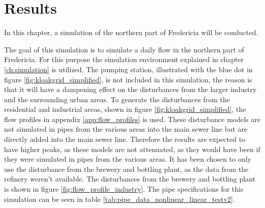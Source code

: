 \chapter{Results}\label{ch:results}
In this chapter, a simulation of the northern part of Fredericia will be conducted.

The goal of this simulation is to simulate a daily flow in the northern part of Fredericia.%
For this purpose the simulation environment explained in chapter \ref{ch:simulation} is utilized. The pumping station, illustrated with the blue dot in figure \ref{fig:kloakgrid_simplified}, is not included in this simulation, the reason is that it will have a dampening effect on the disturbances from the larger industry and the surrounding urban areas. 
To generate the disturbances from the residential and industrial areas, shown in figure \ref{fig:kloakgrid_simplified}, the flow profiles in appendix \ref{app:flow_profiles} is used. These disturbance models are not simulated in pipes from the various areas into the main sewer line but are directly added into the main sewer line. Therefore the results are expected to have higher peaks, as these models are not attenuated, as they would have been if they were simulated in pipes from the various areas. It has been chosen to only use the disturbance from the brewery and bottling plant, as the data from the refinery weren't available. The disturbances from the brewery and bottling plant is shown in figure \ref{fig:flow_profile_industry}. The pipe specifications for this simulation can be seen in table \ref{tab:pipe_data_nonlinear_linear_testv2}.  
